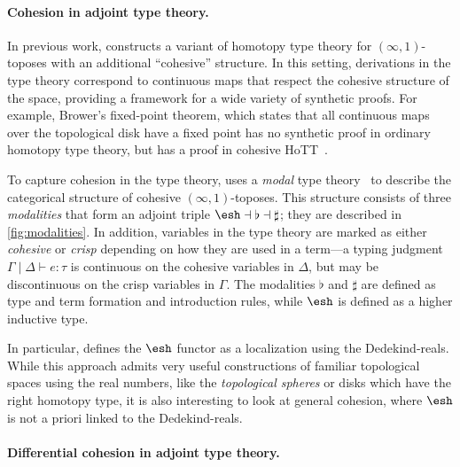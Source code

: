 \documentclass{article}
\begin{document}
\paragraph{Cohesion in adjoint type theory.}

In previous work, \citet{Shulman2015} constructs a variant of homotopy type
theory for $(\infty,1)$-toposes with an additional ``cohesive'' structure. In
this setting, derivations in the type theory correspond to continuous maps that
respect the cohesive structure of the space, providing a framework for a wide
variety of synthetic proofs. For example, Brower's fixed-point theorem, which
states that all continuous maps over the topological disk have a fixed point has
no synthetic proof in ordinary homotopy type theory, but has a proof in cohesive
HoTT~\citep{Shulman2015}.


To capture cohesion in the type theory, \citet{Shulman2015} uses a \emph{modal}
type theory~\citep{Pfenning2001} to describe the categorical structure of
cohesive $(\infty,1)$-toposes. This structure consists of three
\emph{modalities}  that form an adjoint triple
$\shape \dashv \flat \dashv \sharp$; they are described in
\cref{fig:modalities}. In addition, variables in the type theory are marked as
either \emph{cohesive} or \emph{crisp} depending on how they are used in a
term---a typing judgment $\Gamma \mid \Delta \vdash e : \tau$ is continuous on
the cohesive variables in $\Delta$, but may be discontinuous on the crisp
variables in $\Gamma$. The modalities $\flat$ and $\sharp$ are defined as type
and term formation and introduction rules, while $\shape$ is defined as a higher
inductive type.


In particular, \citeauthor{Shulman2015} defines the $\shape$ functor as a
localization using the Dedekind-reals. While this approach admits very
useful constructions of familiar topological spaces using the real numbers, like
the \emph{topological spheres} or disks which have the right homotopy type, it
is also interesting to look at general cohesion, where $\shape$ is not a priori
linked to the Dedekind-reals.


\paragraph{Differential cohesion in adjoint type theory.}
\end{document}
